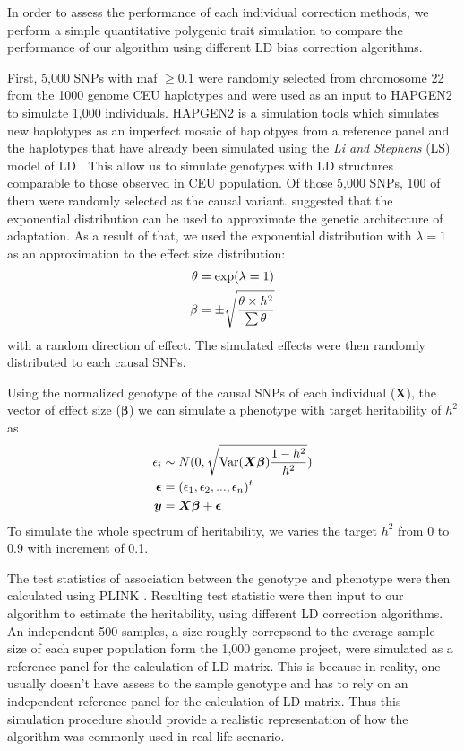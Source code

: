 		In order to assess the performance of each individual correction methods, we perform a simple quantitative polygenic trait simulation to compare the performance of our algorithm using different \gls{LD} bias correction algorithms.
		
		First, 5,000 \glspl{SNP} with \gls{maf} $\ge0.1$ were randomly selected from chromosome 22 from the 1000 genome \gls{CEU} haplotypes and were used as an input to HAPGEN2 \citep{Su2011} to simulate 1,000 individuals.
		HAPGEN2 is a simulation tools which simulates new haplotypes as an imperfect mosaic of haplotpyes from a reference panel and the haplotypes that have already been simulated using the \textit{Li and Stephens} (LS) model of \gls{LD} \citep{Li2003}.
		This allow us to simulate genotypes with \gls{LD} structures comparable to those observed in \gls{CEU} population. 
		Of those 5,000 \glspl{SNP}, 100 of them were randomly selected as the causal variant. 
		\citet{Orr1998} suggested that the exponential distribution can be used to approximate the genetic architecture of adaptation. 
		As a result of that, we used the exponential distribution with $\lambda=1$ as an approximation to the effect size distribution:
		\begin{align}
		\theta&=\mathrm{exp}(\lambda=1)\notag\\
		\beta&=\pm\sqrt{\frac{\theta \times h^2}{\sum \theta}}
		\label{eq:randomEffect}
		\end{align}
		with a random direction of effect.
		The simulated effects were then randomly distributed to each causal \glspl{SNP}.
			
		Using the normalized genotype of the causal \glspl{SNP} of each individual ($\boldsymbol{X}$), the vector of effect size ($\boldsymbol{\beta}$) we can simulate a phenotype with target heritability of $h^2$ as
		\begin{align}
		\epsilon_i&\sim N(0,\sqrt{\mathrm{Var}(\boldsymbol{X\beta})\frac{1-h^2}{h^2}} )\notag\\
		\boldsymbol{\epsilon} &= (\epsilon_1,\epsilon_2,...,\epsilon_n)^t\notag\\
		\boldsymbol{y} &= \boldsymbol{X\beta}+\boldsymbol{\epsilon}
		\label{eq:simulationOfPhenotype}
		\end{align}
		To simulate the whole spectrum of heritability, we varies the target $h^2$ from 0 to 0.9 with increment of 0.1.
		
		The test statistics of association between the genotype and phenotype were then calculated using PLINK \citep{Purcell2007}.
		Resulting test statistic were then input to our algorithm to estimate the heritability, using different \gls{LD} correction algorithms.
		An independent 500 samples, a size roughly correpsond to the average sample size of each super population form the 1,000 genome project,  were simulated as a reference panel for the calculation of \gls{LD} matrix.
		This is because in reality, one usually doesn't have assess to the sample genotype and has to rely on an independent reference panel for the calculation of \gls{LD} matrix. 
		Thus this simulation procedure should provide a realistic representation of how the algorithm was commonly used in real life scenario.
		
